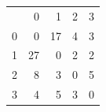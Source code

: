\begin{tabular}{lrrrr}
 & 0 & 1 & 2 & 3 \\
0 & 0 & 17 & 4 & 3 \\
1 & 27 & 0 & 2 & 2 \\
2 & 8 & 3 & 0 & 5 \\
3 & 4 & 5 & 3 & 0 \\
\end{tabular}
